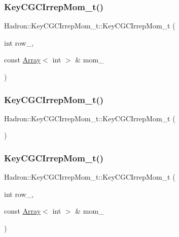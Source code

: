 \subsubsection{\texorpdfstring{KeyCGCIrrepMom\_t()}{KeyCGCIrrepMom\_t()}\hspace{0.1cm}{\footnotesize\ttfamily [2/4]}}
{\footnotesize\ttfamily Hadron\+::\+Key\+C\+G\+C\+Irrep\+Mom\+\_\+t\+::\+Key\+C\+G\+C\+Irrep\+Mom\+\_\+t (\begin{DoxyParamCaption}\item[{int}]{row\+\_\+,  }\item[{const \mbox{\hyperlink{classXMLArray_1_1Array}{Array}}$<$ int $>$ \&}]{mom\+\_\+ }\end{DoxyParamCaption})\hspace{0.3cm}{\ttfamily [inline]}}

\mbox{\label{structHadron_1_1KeyCGCIrrepMom__t_aa3965e02d80a6c483de3e253a4de7826}} 
\subsubsection{\texorpdfstring{KeyCGCIrrepMom\_t()}{KeyCGCIrrepMom\_t()}\hspace{0.1cm}{\footnotesize\ttfamily [3/4]}}
{\footnotesize\ttfamily Hadron\+::\+Key\+C\+G\+C\+Irrep\+Mom\+\_\+t\+::\+Key\+C\+G\+C\+Irrep\+Mom\+\_\+t (\begin{DoxyParamCaption}{ }\end{DoxyParamCaption})\hspace{0.3cm}{\ttfamily [inline]}}

\mbox{\label{structHadron_1_1KeyCGCIrrepMom__t_a467e3ce4ab08bc6438ac855240bead31}} 
\subsubsection{\texorpdfstring{KeyCGCIrrepMom\_t()}{KeyCGCIrrepMom\_t()}\hspace{0.1cm}{\footnotesize\ttfamily [4/4]}}
{\footnotesize\ttfamily Hadron\+::\+Key\+C\+G\+C\+Irrep\+Mom\+\_\+t\+::\+Key\+C\+G\+C\+Irrep\+Mom\+\_\+t (\begin{DoxyParamCaption}\item[{int}]{row\+\_\+,  }\item[{const \mbox{\hyperlink{classXMLArray_1_1Array}{Array}}$<$ int $>$ \&}]{mom\+\_\+ }\end{DoxyParamCaption})\hspace{0.3cm}{\ttfamily [inline]}}



